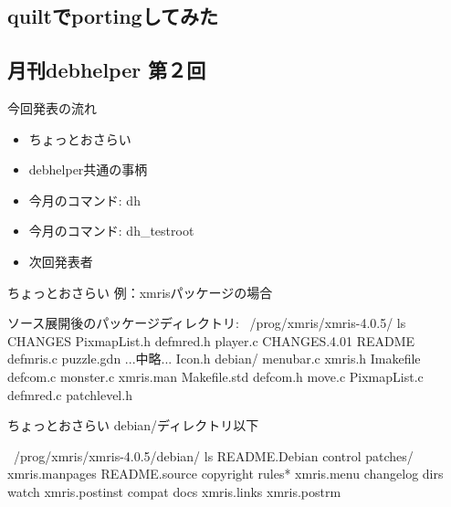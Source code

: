 \subsection{quiltでportingしてみた}
\subsection{月刊debhelper 第２回}
\begin{frame}{今回発表の流れ}
\begin{itemize}
\item ちょっとおさらい
\item debhelper共通の事柄
\item 今月のコマンド: dh
\item 今月のコマンド: dh\_testroot
\item 次回発表者
\end{itemize}
\end{frame}
\begin{frame}[containsverbatim]{ちょっとおさらい}
例：xmrisパッケージの場合
\begin{commandline}
ソース展開後のパッケージディレクトリ:
~/prog/xmris/xmris-4.0.5/ ls
CHANGES       PixmapList.h  defmred.h     player.c
CHANGES.4.01  README        defmris.c     puzzle.gdn
...中略...
Icon.h        debian/       menubar.c     xmris.h
Imakefile     defcom.c      monster.c     xmris.man
Makefile.std  defcom.h      move.c
PixmapList.c  defmred.c     patchlevel.h
\end{commandline}

\end{frame}

\begin{frame}[containsverbatim]{ちょっとおさらい}
debian/ディレクトリ以下
\begin{commandline}
~/prog/xmris/xmris-4.0.5/debian/ ls
README.Debian  control    patches/     xmris.manpages
README.source  copyright  rules*       xmris.menu
changelog      dirs       watch        xmris.postinst
compat         docs       xmris.links  xmris.postrm
\end{commandline}
\end{frame}

